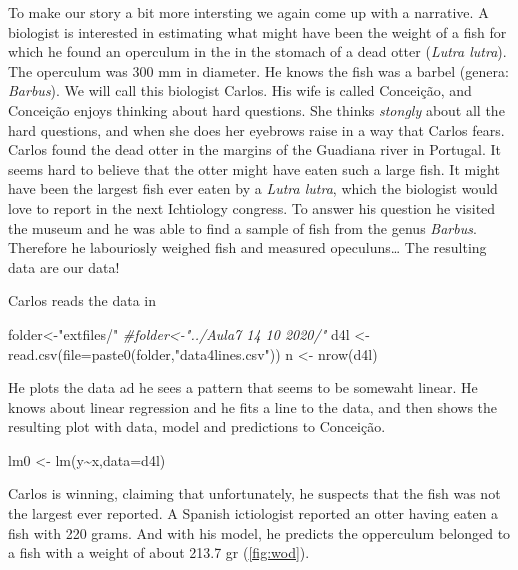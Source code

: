 \documentclass[
]{book}
\newenvironment{Shaded}{\begin{snugshade}}{\end{snugshade}}
\newcommand{\AttributeTok}[1]{\textcolor[rgb]{0.77,0.63,0.00}{#1}}
\newcommand{\CommentTok}[1]{\textcolor[rgb]{0.56,0.35,0.01}{\textit{#1}}}
\newcommand{\FunctionTok}[1]{\textcolor[rgb]{0.00,0.00,0.00}{#1}}
\newcommand{\NormalTok}[1]{#1}
\newcommand{\OtherTok}[1]{\textcolor[rgb]{0.56,0.35,0.01}{#1}}
\newcommand{\SpecialCharTok}[1]{\textcolor[rgb]{0.00,0.00,0.00}{#1}}
\newcommand{\StringTok}[1]{\textcolor[rgb]{0.31,0.60,0.02}{#1}}
\begin{document}
To make our story a bit more intersting we again come up with a narrative. A biologist is interested in estimating what might have been the weight of a fish for which he found an operculum in the in the stomach of a dead otter (\emph{Lutra lutra}). The operculum was 300 mm in diameter. He knows the fish was a barbel (genera: \emph{Barbus}). We will call this biologist Carlos. His wife is called Conceição, and Conceição enjoys thinking about hard questions. She thinks \emph{stongly} about all the hard questions, and when she does her eyebrows raise in a way that Carlos fears. Carlos found the dead otter in the margins of the Guadiana river in Portugal. It seems hard to believe that the otter might have eaten such a large fish. It might have been the largest fish ever eaten by a \emph{Lutra lutra}, which the biologist would love to report in the next Ichtiology congress. To answer his question he visited the museum and he was able to find a sample of fish from the genus \emph{Barbus}. Therefore he labouriosly weighed fish and measured opeculuns\ldots{} The resulting data are our data!

Carlos reads the data in

\begin{Shaded}
\begin{Highlighting}[]
\NormalTok{folder}\OtherTok{\textless{}{-}}\StringTok{"extfiles/"}
\CommentTok{\#folder\textless{}{-}"../Aula7 14 10 2020/"}
\NormalTok{d4l }\OtherTok{\textless{}{-}} \FunctionTok{read.csv}\NormalTok{(}\AttributeTok{file=}\FunctionTok{paste0}\NormalTok{(folder,}\StringTok{"data4lines.csv"}\NormalTok{))}
\NormalTok{n }\OtherTok{\textless{}{-}} \FunctionTok{nrow}\NormalTok{(d4l)}
\end{Highlighting}
\end{Shaded}

He plots the data ad he sees a pattern that seems to be somewaht linear. He knows about linear regression and he fits a line to the data, and then shows the resulting plot with data, model and predictions to Conceição.

\begin{Shaded}
\begin{Highlighting}[]
\NormalTok{lm0 }\OtherTok{\textless{}{-}} \FunctionTok{lm}\NormalTok{(y}\SpecialCharTok{\textasciitilde{}}\NormalTok{x,}\AttributeTok{data=}\NormalTok{d4l)}
\end{Highlighting}
\end{Shaded}

Carlos is winning, claiming that unfortunately, he suspects that the fish was not the largest ever reported. A Spanish ictiologist reported an otter having eaten a fish with 220 grams. And with his model, he predicts the opperculum belonged to a fish with a weight of about 213.7 gr (\ref{fig:wod}).
\end{document}
